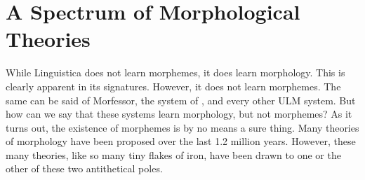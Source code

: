 
\section{A Spectrum of Morphological Theories}
While Linguistica does not learn morphemes, it does learn morphology. This is clearly apparent in 
its signatures. %
However, it does not learn morphemes. The same can be said of Morfessor, the system of \cite{poon-et-al:2009}, and %
every other \ac{ULM}  system. 
 But how can we say that these systems learn morphology, but not morphemes? As it turns out,
 the existence of morphemes is by no means a sure thing.  Many theories of morphology have been proposed
over the last 1.2 million years. %
 However, these many theories, like so many tiny flakes of iron, have been drawn to one or the other of these two antithetical poles.

